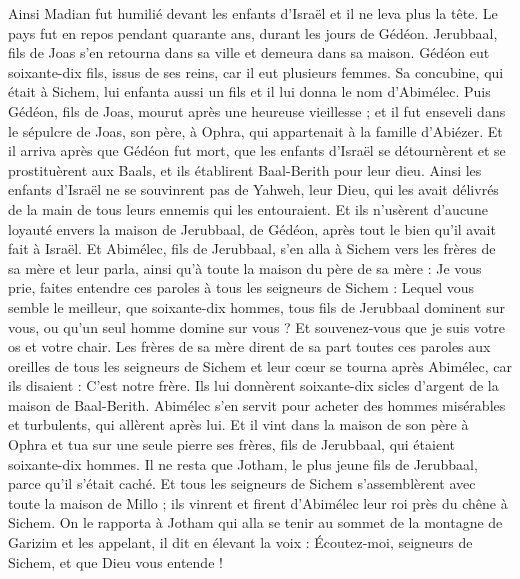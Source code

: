 \begin{multicols}{2}
Ainsi Madian fut humilié devant les enfants d'Israël et il ne leva plus la tête. Le pays fut en repos pendant quarante ans, durant les jours de Gédéon.
Jerubbaal, fils de Joas s'en retourna dans sa ville et demeura dans sa maison.
Gédéon eut soixante-dix fils, issus de ses reins, car il eut plusieurs femmes.
Sa concubine, qui était à Sichem, lui enfanta aussi un fils et il lui donna le nom d'Abimélec.
Puis Gédéon, fils de Joas, mourut après une heureuse vieillesse ; et il fut enseveli dans le sépulcre de Joas, son père, à Ophra, qui appartenait à la famille d'Abiézer.
Et il arriva après que Gédéon fut mort, que les enfants d'Israël se détournèrent et se prostituèrent aux Baals, et ils établirent Baal-Berith pour leur dieu.
Ainsi les enfants d'Israël ne se souvinrent pas de Yahweh, leur Dieu, qui les avait délivrés de la main de tous leurs ennemis qui les entouraient.
Et ils n'usèrent d'aucune loyauté envers la maison de Jerubbaal, de Gédéon, après tout le bien qu'il avait fait à Israël.
\VerseOne{}Et Abimélec, fils de Jerubbaal, s'en alla à Sichem vers les frères de sa mère et leur parla, ainsi qu'à toute la maison du père de sa mère :
Je vous prie, faites entendre ces paroles à tous les seigneurs de Sichem : Lequel vous semble le meilleur, que soixante-dix hommes, tous fils de Jerubbaal dominent sur vous, ou qu'un seul homme domine sur vous ? Et souvenez-vous que je suis votre os et votre chair.
Les frères de sa mère dirent de sa part toutes ces paroles aux oreilles de tous les seigneurs de Sichem et leur cœur se tourna après Abimélec, car ils disaient : C'est notre frère.
Ils lui donnèrent soixante-dix sicles d'argent de la maison de Baal-Berith. Abimélec s'en servit pour acheter des hommes misérables et turbulents, qui allèrent après lui.
Et il vint dans la maison de son père à Ophra et tua sur une seule pierre ses frères, fils de Jerubbaal, qui étaient soixante-dix hommes. Il ne resta que Jotham, le plus jeune fils de Jerubbaal, parce qu'il s'était caché.
Et tous les seigneurs de Sichem s'assemblèrent avec toute la maison de Millo ; ils vinrent et firent d'Abimélec leur roi près du chêne à Sichem.
On le rapporta à Jotham qui alla se tenir au sommet de la montagne de Garizim et les appelant, il dit en élevant la voix : Écoutez-moi, seigneurs de Sichem, et que Dieu vous entende !

\end{multicols}
